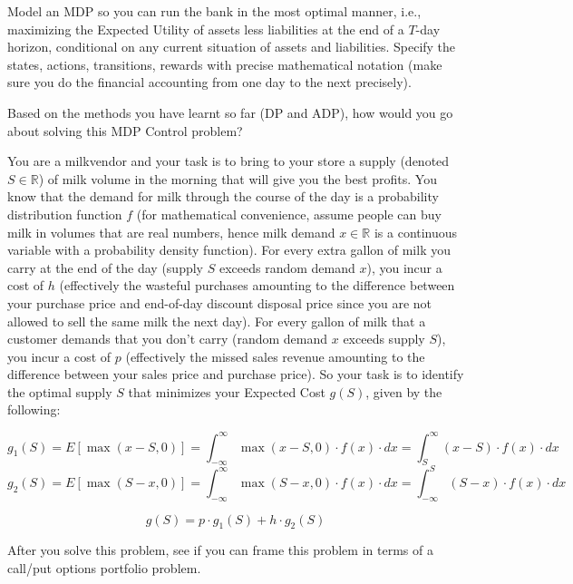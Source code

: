 \documentclass[12pt]{exam}
\begin{document}
\begin{questions}
Model an MDP so you can run the bank in the most optimal manner, i.e., maximizing the Expected Utility of assets less liabilities at the end of a $T$-day horizon, conditional on any current situation of assets and liabilities. Specify the states, actions, transitions, rewards with precise mathematical notation (make sure you do the financial accounting from one day to the next precisely).

Based on the methods you have learnt so far (DP and ADP), how would you go about solving this MDP Control problem?

\question You are a milkvendor and your task is to bring to your store a supply (denoted $S \in \mathbb{R}$) of milk volume in the morning that will give you the best profits. You know that the demand for milk through the course of the day is a probability distribution function $f$ (for mathematical convenience, assume people can buy milk in volumes that are real numbers, hence milk demand $x \in \mathbb{R}$ is a continuous variable with a probability density function). For every extra gallon of milk you carry at the end of the day (supply $S$ exceeds random demand $x$), you incur a cost of $h$ (effectively the wasteful purchases amounting to the difference between your purchase price and end-of-day discount disposal price since you are not allowed to sell the same milk the next day). For every gallon of milk that a customer demands that you don't carry (random demand $x$ exceeds supply $S$), you incur a cost of $p$ (effectively the missed sales revenue amounting to the difference between your sales price and purchase price). So your task is to identify the optimal supply $S$ that minimizes your Expected Cost $g(S)$, given by the following:

$$g_1(S) = E[\max(x-S, 0)] = \int_{-\infty}^{\infty} \max(x-S, 0) \cdot f(x) \cdot dx = \int_S^{\infty} (x-S) \cdot f(x) \cdot dx$$
$$g_2(S) = E[\max(S-x, 0)] = \int_{-\infty}^{\infty} \max(S-x, 0) \cdot f(x) \cdot dx = \int_{-\infty}^S (S-x) \cdot f(x) \cdot dx$$

$$g(S) = p \cdot g_1(S) + h \cdot g_2(S)$$

After you solve this problem, see if you can frame this problem in terms of a call/put options portfolio problem.


\end{questions}
\end{document}
